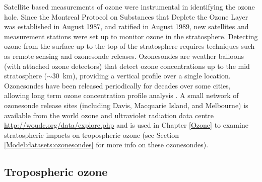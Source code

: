     
    Satellite based measurements of ozone were instrumental in identifying the 
    ozone hole.
    Since the Montreal Protocol on Substances that Deplete the Ozone Layer was 
    established in August 1987, and ratified in August 1989, new satellites and 
    measurement stations were set up to monitor ozone in the stratosphere.
    Detecting ozone from the surface up to the top of the stratosphere requires techniques such as remote sensing and ozonesonde releases.
    Ozonesondes are weather balloons (with attached ozone detectors) that detect ozone concentrations up to the mid stratosphere ($\sim 30$~km), providing a vertical profile over a single location.
    Ozonesondes have been released periodically for decades over some cities, allowing long term ozone concentration profile analysis \parencite[e.g.,][]{Brinksma2002}.
    A small network of ozonesonde release sites (including Davis, Macquarie Island, and Melbourne) is available from the world ozone and ultraviolet radiation data centre \url{http://woudc.org/data/explore.php} and is used in Chapter \ref{Ozone} to examine stratospheric impacts on tropospheric ozone (see Section \ref{Model:datasets:ozonesondes} for more info on these ozonesondes).
  
  \subsection{Tropospheric ozone}
    
